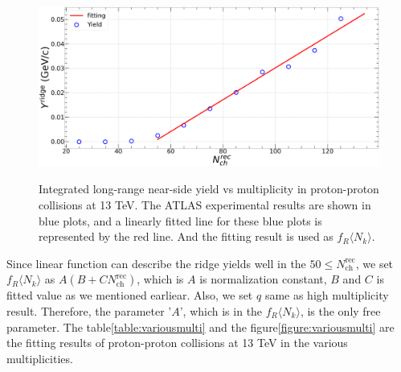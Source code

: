 \documentclass[jkps,fleqn,showpacs,showkeys]{revtex4}
\begin{document}
\begin{figure}[ht]
  \centering
  \includegraphics[width=12cm, height=6cm]{./Figures/Yield_Fitting.png}
  \caption{Integrated long-range near-side yield vs multiplicity in proton-proton collisions at 13 TeV.
  The ATLAS experimental results are shown in blue plots\cite{atlas}, and a linearly fitted line for these blue plots is represented by the red line.
  And the fitting result is used as $f_R \langle N_k \rangle$.
  }
  \label{figure:frnk_multi}
\end{figure}

Since linear function can describe the ridge yields well in the $50\leq N_{\text{ch}}^{\text{rec}}$, we set $f_R \langle N_k \rangle$ as $A(B+C N_{\text{ch}}^{\text{rec}})$, which is $A$ is normalization constant, $B$ and $C$ is fitted value as we mentioned earliear.
Also, we set $q$ same as high multiplicity result.
Therefore, the parameter '$A$', which is in the $f_R \langle N_k \rangle$, is the only free parameter.
The table\ref{table:variousmulti} and the figure\ref{figure:variousmulti} are the fitting results of proton-proton collisions at 13 TeV in the various multiplicities.
\end{document}
